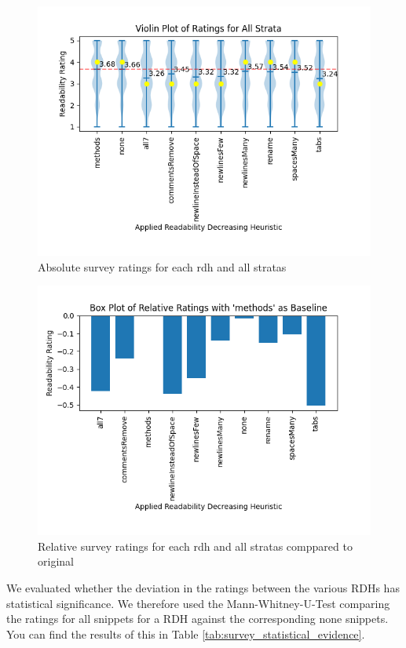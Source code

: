 \documentclass[%
class=scrreprt,
chapterprefix=false,%
open=right,%
twoside=false,%
paper=a4,%
logofile={Logo\_zentral\_farbig\_EN.png},%
thesistype=master,%
UKenglish,%
]{se2thesis}
\theoremstyle{definition}
\begin{document}
	\begin{figure}[t]
		\centering
		\includegraphics[width=\textwidth]{img/survey_ratings_violin_all.png}
		\caption{Absolute survey ratings for each rdh and all stratas}
		\label{fig:survey_ratings_violin_all}
	\end{figure}
	
	\begin{figure}[t]
		\centering
		\includegraphics[width=\textwidth]{img/survey_ratings_bar_all.png}
		\caption{Relative survey ratings for each rdh and all stratas comppared to original}
		\label{fig:survey_ratings_bar_all}
	\end{figure}
		
	We evaluated whether the deviation in the ratings between the various RDHs has statistical significance. We therefore used the Mann-Whitney-U-Test comparing the ratings for all snippets for a RDH against the corresponding none snippets. You can find the results of this in Table \ref{tab:survey_statistical_evidence}.
	
\end{document}

